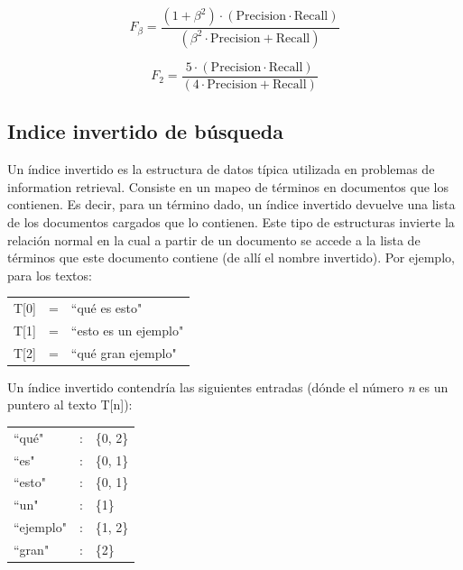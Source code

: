 \begin{equation}\label{eq:fb}
  F_\beta = \frac{(1 + \beta^2) \cdot (\mathrm{Precision} \cdot \mathrm{Recall})}{(\beta^2 \cdot \mathrm{Precision} + \mathrm{Recall})}
\end{equation}


\begin{equation}\label{eq:f2}
  F_2 = \frac{5 \cdot (\mathrm{Precision} \cdot \mathrm{Recall})}{(4 \cdot \mathrm{Precision} + \mathrm{Recall})}
\end{equation}


\subsection{Indice invertido de búsqueda}
\label{subsec:indice-invertido}

Un índice invertido es la estructura de datos típica utilizada en problemas de information retrieval. Consiste en un mapeo de términos en documentos que los contienen. Es decir, para un término dado, un índice invertido devuelve una lista de los documentos cargados que lo contienen. Este tipo de estructuras invierte la relación normal en la cual a partir de un documento se accede a la lista de términos que este documento contiene (de allí el nombre invertido).
Por ejemplo, para los textos:
\medskip

\begin{tabular}{lll}
T[0] & = & ``qué es esto" \\
T[1] & = & ``esto es un ejemplo" \\
T[2] & = & ``qué gran ejemplo" \\
\end{tabular}

\medskip
Un índice invertido contendría las siguientes entradas (dónde el número \textit{n} es un puntero al texto T[n]):
\medskip

\begin{tabular}{lll}
	``qué" & : & \{0, 2\}\\
	``es" &:& \{0, 1\}\\
	``esto" & :& \{0, 1\} \\
	``un" & :&   \{1\} \\
	``ejemplo" & :& \{1, 2\} \\
	``gran" & :& \{2\} \\
\end{tabular}


